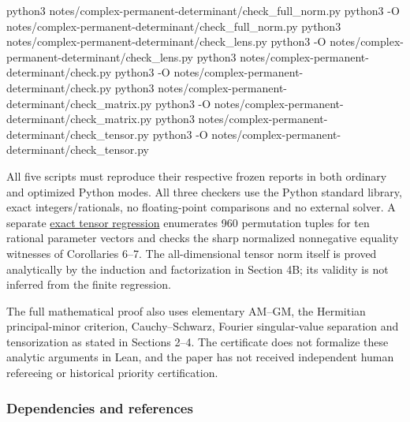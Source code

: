 \documentclass[
  11pt,
]{article}
\newenvironment{Shaded}{}{}
\newcommand{\AttributeTok}[1]{\textcolor[rgb]{0.49,0.56,0.16}{#1}}
\newcommand{\ExtensionTok}[1]{#1}
\newcommand{\NormalTok}[1]{#1}
\begin{document}
\begin{Shaded}
\begin{Highlighting}[]
\ExtensionTok{python3}\NormalTok{ notes/complex{-}permanent{-}determinant/check\_full\_norm.py}
\ExtensionTok{python3} \AttributeTok{{-}O}\NormalTok{ notes/complex{-}permanent{-}determinant/check\_full\_norm.py}
\ExtensionTok{python3}\NormalTok{ notes/complex{-}permanent{-}determinant/check\_lens.py}
\ExtensionTok{python3} \AttributeTok{{-}O}\NormalTok{ notes/complex{-}permanent{-}determinant/check\_lens.py}
\ExtensionTok{python3}\NormalTok{ notes/complex{-}permanent{-}determinant/check.py}
\ExtensionTok{python3} \AttributeTok{{-}O}\NormalTok{ notes/complex{-}permanent{-}determinant/check.py}
\ExtensionTok{python3}\NormalTok{ notes/complex{-}permanent{-}determinant/check\_matrix.py}
\ExtensionTok{python3} \AttributeTok{{-}O}\NormalTok{ notes/complex{-}permanent{-}determinant/check\_matrix.py}
\ExtensionTok{python3}\NormalTok{ notes/complex{-}permanent{-}determinant/check\_tensor.py}
\ExtensionTok{python3} \AttributeTok{{-}O}\NormalTok{ notes/complex{-}permanent{-}determinant/check\_tensor.py}
\end{Highlighting}
\end{Shaded}

All five scripts must reproduce their respective frozen reports in both
ordinary and optimized Python modes. All three checkers use the Python
standard library, exact integers/rationals, no floating-point
comparisons and no external solver. A separate
\href{../../notes/complex-permanent-determinant/check_tensor.py}{exact
tensor regression} enumerates 960 permutation tuples for ten rational
parameter vectors and checks the sharp normalized nonnegative equality
witnesses of Corollaries 6--7. The all-dimensional tensor norm itself is
proved analytically by the induction and factorization in Section 4B;
its validity is not inferred from the finite regression.

The full mathematical proof also uses elementary AM--GM, the Hermitian
principal-minor criterion, Cauchy--Schwarz, Fourier singular-value
separation and tensorization as stated in Sections 2--4. The certificate
does not formalize these analytic arguments in Lean, and the paper has
not received independent human refereeing or historical priority
certification.

\subsubsection{Dependencies and
references}\label{dependencies-and-references}
\end{document}
